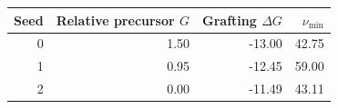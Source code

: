 \begin{tabular}{rrrr}\toprule
Seed & Relative precursor $G$ & Grafting $\Delta G$ & $\nu_{\min}$\\\midrule
0 & 1.50 & -13.00 & 42.75\\
1 & 0.95 & -12.45 & 59.00\\
2 & 0.00 & -11.49 & 43.11\\
\bottomrule\end{tabular}
